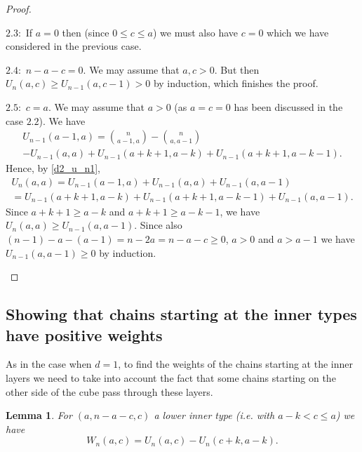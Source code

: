 \documentclass[11pt, reqno]{amsart}
\newenvironment{caseindent}[1][2em]
  {%
    \begin{list}{}{%
      \setlength{\leftmargin}{#1}%
      \setlength{\rightmargin}{0pt}%
      \setlength{\topsep}{0pt}%
      \setlength{\partopsep}{0pt}%
      \setlength{\itemsep}{0pt}%
      \setlength{\parsep}{\parskip}%
      \setlength{\listparindent}{\parindent}%
    }%
    \item[]%
    \let\fullwidthdisplay\relax
    \ignorespaces
  }
  {%
    \end{list}%
    \ignorespacesafterend
  }
\newcommand{\leanblueprintbase}{https://mj141592.github.io/weighted-chains-paper}
\newif\ifleanlinks
\newcommand{\leanblueprint}[1]{%
  \ifleanlinks
    \leavevmode\unskip\penalty9999\hbox{}\nobreak\hfill\quad
    \href{\leanblueprintbase/theorems/#1/}{%
      \mbox{\normalfont\footnotesize\textcolor{blue}{[\textsf{Lean formalisation}]}}}%
    \par\nobreak
  \fi
}
\newtheorem{lemma}[theorem]{Lemma}
\theoremstyle{remark}
\numberwithin{equation}{section}
\newcommand{\un}{U_{n}}
\newcommand{\uno}{U_{n-1}}
\begin{document}
\begin{proof}
\begin{caseindent}
\begin{caseindent}
        $2.3:$ If $a=0$ then (since $0 \leqslant c \leqslant a$) we must also have $c=0$ which we have considered in the previous case.
    
        $2.4:$ $n-a-c=0$. We may assume that $a, c > 0$. But then $\un(a, c) \geqslant \uno(a, c-1)>0$ by induction, which finishes the proof.
    
        $2.5:$ $c=a$. We may assume that $a>0$ (as $a=c=0$ has been discussed in the case $2.2$).
        We have
            \begin{multline*}
                \uno(a-1, a)=\binom{n}{a-1, a} - \binom{n}{a, a-1}\\ - \uno(a, a) + \uno(a+k+1, a-k) + \uno(a+k+1, a-k-1).
            \end{multline*}
            Hence, by \ref{d2_u_n1},
            \begin{multline*}
                \un(a, a) = \uno(a-1, a) + \uno(a, a) + \uno(a, a-1)\\
                = \uno(a+k+1, a-k) + \uno(a+k+1, a-k-1) + \uno(a, a-1).
            \end{multline*}
            Since $a+k+1 \geqslant a-k$ and $a+k+1 \geqslant a-k-1$, we have $\un(a, a) \geqslant \uno(a, a-1)$. Since also $(n-1)-a-(a-1)=n-2a=n-a-c \geqslant 0$, $a > 0$ and $a>a-1$ we have $\uno(a, a-1) \geqslant 0$ by induction. \qedhere
    \end{caseindent}
\end{caseindent}
\end{proof}

\subsection{Showing that chains starting at the inner types have positive weights}

As in the case when $d=1$, to find the weights of the chains starting at the inner layers we need to take into account the fact that some chains starting on the other side of the cube pass through these layers.

\begin{lemma}
\label{wc:lem:ternary-inner-weight}
    For $(a, n-a-c, c)$ a lower inner type (i.e. with $a-k < c \leqslant a$) we have
    \begin{equation*}
        W_n(a, c)=U_n(a, c) - U_n(c+k, a-k).
    \end{equation*}
\leanblueprint{ternary-inner-weight}
\end{lemma}
\end{document}
